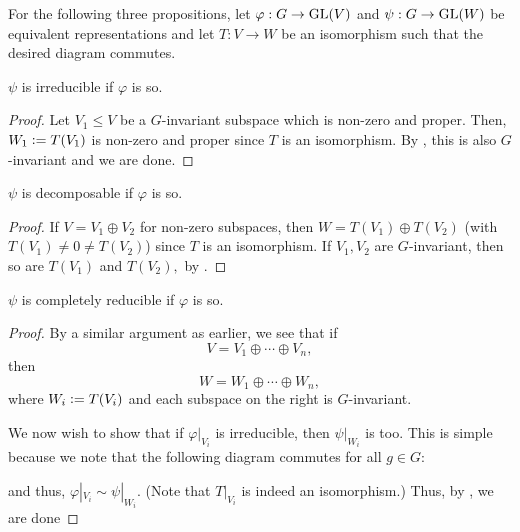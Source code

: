 For the following three propositions, let $\varphi:G \to \operatorname{GL}(V)$ and $\psi:G \to \operatorname{GL}(W)$ be equivalent representations and let $T: V \to W$ be an isomorphism such that the desired diagram commutes.

\begin{prop} \label{prop:irreducibleequiv}
	$\psi$ is irreducible if $\varphi$ is so.
\end{prop}
\begin{proof} 
	Let $V_1 \le V$ be a $G$-invariant subspace which is non-zero and proper. Then, $W_1 \vcentcolon= T(V_1)$ is non-zero and proper since $T$ is an isomorphism. By , this is also $G$-invariant and we are done.
\end{proof}

\begin{prop} \label{prop:decomposableequiv}
	$\psi$ is decomposable if $\varphi$ is so.
\end{prop}
\begin{proof} 
	If $V = V_1 \oplus V_2$ for non-zero subspaces, then $W = T(V_1) \oplus T(V_2)$ (with $T(V_1) \neq 0 \neq T(V_2)$) since $T$ is an isomorphism. If $V_1, V_2$ are $G$-invariant, then so are $T(V_1)$ and $T(V_2),$ by .
\end{proof}

\begin{prop} \label{prop:compreducibleequiv}
	$\psi$ is completely reducible if $\varphi$ is so.
\end{prop}
\begin{proof} 
	By a similar argument as earlier, we see that if
	\begin{equation*} 
		V = V_1 \oplus \cdots \oplus V_n,
	\end{equation*}
	then
	\begin{equation*} 
		W = W_1 \oplus \cdots \oplus W_n,
	\end{equation*}
	where $W_i \vcentcolon= T(V_i)$ and each subspace on the right is $G$-invariant.

	We now wish to show that if $\varphi|_{V_i}$ is irreducible, then $\psi|_{W_i}$ is too. This is simple because we note that the following diagram commutes for all $g \in G:$
	\begin{center}
	\end{center}
	and thus, $\varphi|_{V_i} \sim \psi|_{W_i}.$ (Note that $T|_{V_i}$ is indeed an isomorphism.) Thus, by , we are done
\end{proof}

